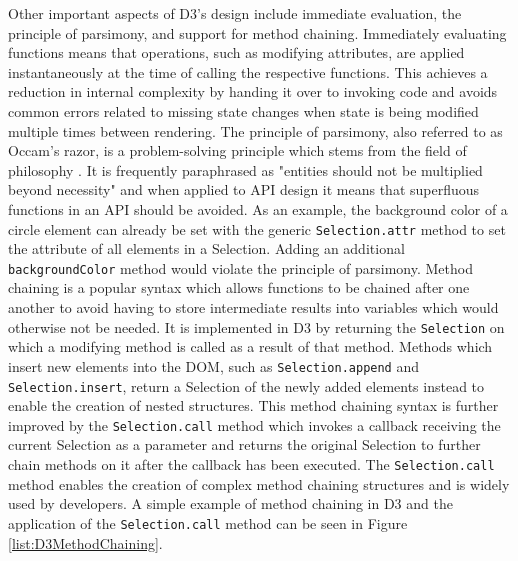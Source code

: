 Other important aspects of D3's design include immediate evaluation, the principle of parsimony, and support for method chaining.
Immediately evaluating functions means that operations, such as modifying attributes, are applied instantaneously at the time of calling the respective functions.
This achieves a reduction in internal complexity by handing it over to invoking code and avoids common errors related to missing state changes when state is being modified multiple times between rendering.
The principle of parsimony, also referred to as Occam's razor, is a problem-solving principle which stems from the field of philosophy \parencite{PrincipleOfParsimony}.
It is frequently paraphrased as "entities should not be multiplied beyond necessity" and when applied to API design it means that superfluous functions in an API should be avoided.
As an example, the background color of a circle element can already be set with the generic \lstinline{Selection.attr} method to set the  attribute of all elements in a Selection.
Adding an additional \lstinline{backgroundColor} method would violate the principle of parsimony.
Method chaining is a popular syntax which allows functions to be chained after one another to avoid having to store intermediate results into variables which would otherwise not be needed.
It is implemented in D3 by returning the \lstinline{Selection} on which a modifying method is called as a result of that method.
Methods which insert new elements into the DOM, such as \lstinline{Selection.append} and \lstinline{Selection.insert}, return a Selection of the newly added elements instead to enable the creation of nested structures.
This method chaining syntax is further improved by the \lstinline{Selection.call} method which invokes a callback receiving the current Selection as a parameter and returns the original Selection to further chain methods on it after the callback has been executed.
The \lstinline{Selection.call} method enables the creation of complex method chaining structures and is widely used by developers.
A simple example of method chaining in D3 and the application of the \lstinline{Selection.call} method can be seen in Figure \ref{list:D3MethodChaining}.

\begin{samepage}
 
    A simple example of method chaining in D3 which creates an  and  element inside a .
  },
]{listings/d3-method-chaining.js}
\end{samepage}

